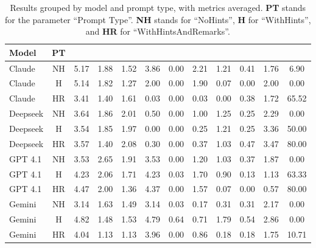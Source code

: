 \documentclass[12pt,a4paper,openright,twoside]{book}
\begin{document}
\begin{table}[htbp]
    \centering
    \footnotesize
    \begin{tabular}{l|c|ccccccccc|c}%
        \toprule
        \textbf{Model} & \textbf{PT} & \PC{} & \CC{} & \PBC{} & \GC{} & \RR{} & \NGC{} & \NBC{} & \GSA{} & \BSA{} & \TSR{} \\  
        \midrule
        Claude & NH & 5.17 & 1.88 & 1.52 & 3.86 & 0.00 & 2.21 & 1.21 & 0.41 & 1.76 & 6.90 \\
        Claude & H & 5.14 & 1.82 & 1.27 & 2.00 & 0.00 & 1.90 & 0.07 & 0.00 & 2.00 & 0.00 \\
        Claude & HR & 3.41 & 1.40 & 1.61 & 0.03 & 0.00 & 0.03 & 0.00 & 0.38 & 1.72 & 65.52 \\
        Deepseek & NH & 3.64 & 1.86 & 2.01 & 0.50 & 0.00 & 1.00 & 1.25 & 0.25 & 2.29 & 0.00 \\
        Deepseek & H & 3.54 & 1.85 & 1.97 & 0.00 & 0.00 & 0.25 & 1.21 & 0.25 & 3.36 & 50.00 \\
        Deepseek & HR & 3.57 & 1.40 & 2.08 & 0.30 & 0.00 & 0.37 & 1.03 & 0.47 & 3.47 & 80.00 \\
        GPT 4.1 & NH & 3.53 & 2.65 & 1.91 & 3.53 & 0.00 & 1.20 & 1.03 & 0.37 & 1.87 & 0.00 \\
        GPT 4.1 & H & 4.23 & 2.06 & 1.71 & 4.23 & 0.03 & 1.70 & 0.90 & 0.13 & 1.13 & 63.33 \\
        GPT 4.1 & HR & 4.47 & 2.00 & 1.36 & 4.37 & 0.00 & 1.57 & 0.07 & 0.00 & 0.57 & 80.00 \\
        Gemini & NH & 3.14 & 1.63 & 1.49 & 3.14 & 0.03 & 0.17 & 0.31 & 0.31 & 2.17 & 0.00 \\
        Gemini & H & 4.82 & 1.48 & 1.53 & 4.79 & 0.64 & 0.71 & 1.79 & 0.54 & 2.86 & 0.00 \\
        Gemini & HR & 4.04 & 1.13 & 1.13 & 3.96 & 0.00 & 0.86 & 0.18 & 0.18 & 1.75 & 10.71 \\
        \bottomrule
    \end{tabular}
    \caption{Results grouped by model and prompt type, with metrics averaged. \textbf{PT} stands for the parameter ``Prompt Type''. \textbf{NH} stands for ``NoHints'', \textbf{H} for ``WithHints'', and \textbf{HR} for ``WithHintsAndRemarks''.}
    \label{tab:byPromptAndModel}
\end{table}
\end{document}
